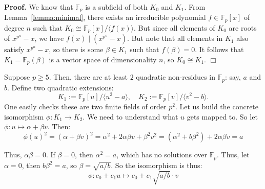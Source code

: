 \documentclass{template}
\newcommand{\qedwhite}{\hfill \ensuremath{\Box}}
\begin{document}
\textbf{Proof.} We know that $\mathbb{F}_p$ is a subfield of both $K_0$ and
$K_1$. From Lemma~\ref{lemma:minimal}, there exists an irreducible polynomial $f
\in \mathbb{F}_p[x]$ of degree $n$ such that $K_0 \cong \mathbb{F}_p[x]/\langle
f(x) \rangle$. But since all elements of $K_0$ are roots of $x^{p^n}-x$, we have
$f(x) \mid (x^{p^n}-x)$. But note that all elements in $K_1$ also satisfy
$x^{p^n}-x$, so there is some $\beta \in K_1$ such that $f(\beta)=0$. It follows
that $K_1 = \mathbb{F}_p(\beta)$ is a vector space of dimensionality $n$, so
$K_0 \cong K_1$. \qedwhite


\begin{example}
    Suppose $p \geq 5$. Then, there are at least $2$ quadratic non-residues 
    in $\mathbb{F}_p$: say, $a$ and $b$. Define two quadratic extensions:
    \begin{equation*}
        K_1 := \mathbb{F}_p[u] / \langle u^2-a\rangle, \quad K_2 := \mathbb{F}_p[v] / \langle v^2 - b \rangle.
    \end{equation*}
    One easily checks these are two finite fields of order $p^2$. Let us build
    the concrete isomorphism $\phi: K_1 \to K_2$. We need to understand what 
    $u$ gets mapped to. So let $\phi: u \mapsto \alpha + \beta v$. Then:
    \begin{equation*}
        \phi(u)^2 = (\alpha + \beta v)^2 = \alpha^2 + 2\alpha\beta v+ \beta^2 v^2 = (\alpha^2 + b\beta^2) + 2\alpha\beta v = a
    \end{equation*}

    Thus, $\alpha\beta=0$. If $\beta=0$, then $\alpha^2=a$, which has no
    solutions over $\mathbb{F}_p$. Thus, let $\alpha=0$, then $b\beta^2=a$, so
    $\beta=\sqrt{a/b}$. So the isomorphism is thus:
    \begin{equation*}
        \phi: c_0 + c_1u \mapsto c_0 + c_1\sqrt{a/b}\cdot v
    \end{equation*}
\end{example}
\end{document}
